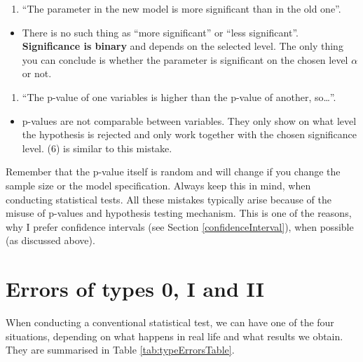 \documentclass[
]{book}
\providecommand{\tightlist}{%
  \setlength{\itemsep}{0pt}\setlength{\parskip}{0pt}}
\theoremstyle{definition}
\theoremstyle{definition}
\theoremstyle{definition}
\theoremstyle{definition}
\theoremstyle{remark}
\begin{document}
\begin{enumerate}
\def\labelenumi{\arabic{enumi}.}
\setcounter{enumi}{6}
\tightlist
\item
  ``The parameter in the new model is more significant than in the old one''.
\end{enumerate}

\begin{itemize}
\tightlist
\item
  There is no such thing as ``more significant'' or ``less significant''. \textbf{Significance is binary} and depends on the selected level. The only thing you can conclude is whether the parameter is significant on the chosen level \(\alpha\) or not.
\end{itemize}

\begin{enumerate}
\def\labelenumi{\arabic{enumi}.}
\setcounter{enumi}{7}
\tightlist
\item
  ``The p-value of one variables is higher than the p-value of another, so\ldots{}''.
\end{enumerate}

\begin{itemize}
\tightlist
\item
  p-values are not comparable between variables. They only show on what level the hypothesis is rejected and only work together with the chosen significance level. (6) is similar to this mistake.
\end{itemize}

Remember that the p-value itself is random and will change if you change the sample size or the model specification. Always keep this in mind, when conducting statistical tests. All these mistakes typically arise because of the misuse of p-values and hypothesis testing mechanism. This is one of the reasons, why I prefer confidence intervals (see Section \ref{confidenceInterval}), when possible (as discussed above).

\hypertarget{typeErrors}{%
\section{Errors of types 0, I and II}\label{typeErrors}}

When conducting a conventional statistical test, we can have one of the four situations, depending on what happens in real life and what results we obtain. They are summarised in Table \ref{tab:typeErrorsTable}.
\end{document}
